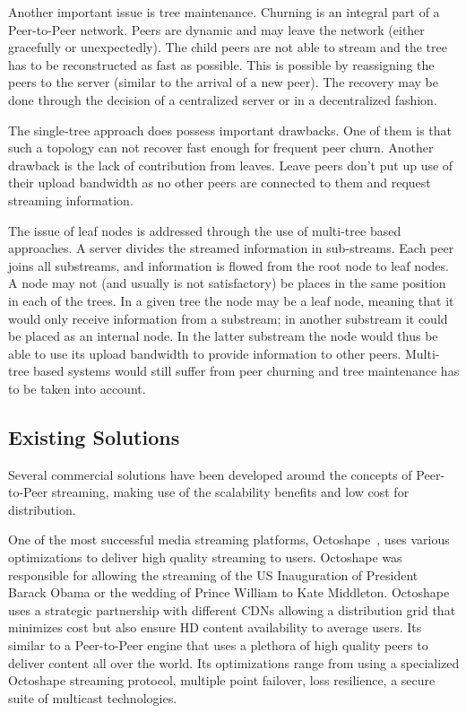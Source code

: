 Another important issue is tree maintenance. Churning is an integral part of
a Peer-to-Peer network. Peers are dynamic and may leave the network (either
gracefully or unexpectedly). The child peers are not able to stream and the
tree has to be reconstructed as fast as possible. This is possible by
reassigning the peers to the server (similar to the arrival of a new peer).
The recovery may be done through the decision of a centralized server or in a
decentralized fashion.

The single-tree approach does possess important drawbacks. One of them is that
such a topology can not recover fast enough for frequent peer churn. Another
drawback is the lack of contribution from leaves. Leave peers don't put up use
of their upload bandwidth as no other peers are connected to them and request
streaming information.

The issue of leaf nodes is addressed through the use of multi-tree based
approaches. A server divides the streamed information in sub-streams. Each
peer joins all substreams, and information is flowed from the root node to
leaf nodes. A node may not (and usually is not satisfactory) be places in the
same position in each of the trees. In a given tree the node may be a leaf
node, meaning that it would only receive information from a substream; in
another substream it could be placed as an internal node. In the latter
substream the node would thus be able to use its upload bandwidth to provide
information to other peers. Multi-tree based systems would still suffer from
peer churning and tree maintenance has to be taken into account.

\subsection{Existing Solutions}
\label{subsec:p2p-systems:solutions}

Several commercial solutions have been developed around the concepts of
Peer-to-Peer streaming, making use of the scalability benefits and low cost
for distribution.

One of the most successful media streaming platforms,
Octoshape~\cite{octoshape},
uses various optimizations to deliver high quality streaming to users.
Octoshape was responsible for allowing the streaming of the US Inauguration of
President Barack Obama or the wedding of Prince William to Kate Middleton.
Octoshape uses a strategic partnership with different CDNs allowing a
distribution grid that minimizes cost but also ensure HD content availability
to average users. Its similar to a Peer-to-Peer engine that uses a plethora of
high quality peers to deliver content all over the world. Its optimizations
range from using a specialized Octoshape streaming protocol, multiple point
failover, loss resilience, a secure suite of multicast technologies.

